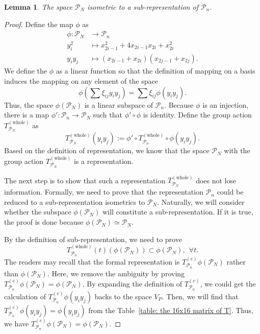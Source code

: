 \documentclass{article}
\newtheorem{lemma}{Lemma}
\newcommand{\Twhole}{T^{(\text{whole})}}
\begin{document}
\begin{lemma}
    \label{lemma: reduce Pn to PN}
    The space $\mathcal{P}_N$ isometric to a sub-representation of $\mathcal{P}_n$.
\end{lemma}
\begin{proof}
    Define the map $\phi$ as
    \begin{equation}
        \begin{aligned}
            \phi : \mathcal{P}_N &\to \mathcal{P}_n \\
              y_i^2 &\mapsto x_{2i-1}^2+4 x_{2i-1} x_{2i}+x_{2i}^2\\
           y_i y_j &\mapsto  \left(x_{2i-1}+x_{2i}\right)\left(x_{2j-1}+x_{2j}\right).
        \end{aligned}
    \end{equation}
    We define the  $\phi$ as a linear function so that the definition of mapping on a basis induces the mapping on any element of the space
    \begin{equation}
        \phi(\sum \xi_{ij}y_i y_j) = \sum \xi_{ij}\phi(y_i y_j).
    \end{equation}
    Thus, the space $\phi(\mathcal{P}_N)$ is a linear subspace of $\mathcal{P}_n$. Because $\phi$ is an injection, there is a map $\phi': \mathcal{P}_n \to \mathcal{P}_N$ such that $\phi' \circ\phi$ is identity. 
    Define the group action $\Twhole_{\mathcal{P}_N}$ as 
    \begin{equation}
        \Twhole_{\mathcal{P}_N}(y_i y_j) := \phi' \circ \Twhole_{\mathcal{P}_n}\circ \phi(y_i y_j).
    \end{equation}
    Based on the definition of representation, we know that the space $\mathcal{P}_N$ with the group action $\Twhole_{\mathcal{P}_N}$ is a representation. 
    
    The next step is to show that such a representation $\Twhole_{\mathcal{P}_N}$ does not lose information. Formally, we need to prove that the representation $\mathcal{P}_n$ could be reduced to a sub-representation isometrics to $\mathcal{P}_N$. Naturally, we will consider whether the subspace $\phi(\mathcal{P}_N) $ will constitute a sub-representation. If it is true, the proof is done because $\phi(\mathcal{P}_N) \simeq \mathcal{P}_N$.

    By the definition of sub-representation, we need to prove
    \begin{equation}
    \label{eq: PN is a sub representation}
        \Twhole_{\mathcal{P}_n}(t)(\phi(\mathcal{P}_N)) \subset \phi(\mathcal{P}_N), ~~\forall t .
    \end{equation}
    The readers may recall that the formal representation is $T^{(e)}_{\mathcal{P}_n} \phi(\mathcal{P}_N)$ rather than $\phi(\mathcal{P}_N)$. Here, we remove the ambiguity by proving $T^{(e)}_{\mathcal{P}_n} \phi(\mathcal{P}_N) = \phi(\mathcal{P}_N)$. 
    By expanding the definition of $T^{(e)}_{\mathcal{P}_n}$, we could get the calculation of $T^{(e)}_{\mathcal{P}_n} \phi(y_i y_j)$ backs to the space $V_P$. Then, we will find that $T^{(e)}_{\mathcal{P}_n} \phi(y_i y_j) = \phi(y_i y_j)$ from the Table~\ref{table: the 16x16 matrix of T}. Thus, we have $T^{(e)}_{\mathcal{P}_n} \phi(\mathcal{P}_N) = \phi(\mathcal{P}_N)$.
 

\end{proof}
\end{document}
